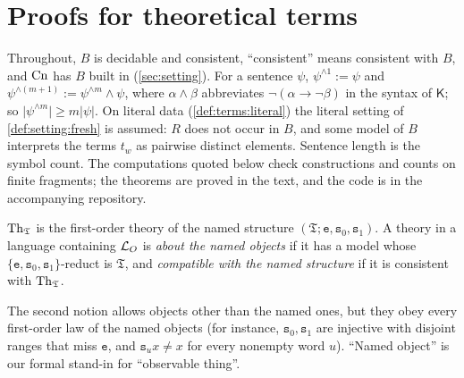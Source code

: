 \section{Proofs for theoretical terms}\label{app:terms}

Throughout, $B$ is decidable and consistent, ``consistent'' means consistent with $B$, and $\mathrm{Cn}$ has $B$ built in (\cref{sec:setting}). For a sentence $\psi$, $\psi^{\wedge1}:=\psi$ and $\psi^{\wedge(m+1)}:=\psi^{\wedge m}\wedge\psi$, where $\alpha\wedge\beta$ abbreviates $\neg(\alpha\to\neg\beta)$ in the syntax of $\mathsf K$; so $\lvert\psi^{\wedge m}\rvert\ge m\lvert\psi\rvert$. On literal data (\cref{def:terms:literal}) the literal setting of \cref{def:setting:fresh} is assumed: $R$ does not occur in $B$, and some model of $B$ interprets the terms $t_w$ as pairwise distinct elements. Sentence length is the symbol count. The computations quoted below check constructions and counts on finite fragments; the theorems are proved in the text, and the code is in the accompanying repository.

\begin{definition}\label{def:terms:named}
$\mathrm{Th}_{\mathfrak{T}}$ is the first-order theory of the named structure $(\mathfrak T;\mathtt e,\mathtt s_0,\mathtt s_1)$. A theory in a language containing $\mathcal{L}_{O}$ is \emph{about the named objects} if it has a model whose $\{\mathtt e,\mathtt s_0,\mathtt s_1\}$-reduct is $\mathfrak T$, and \emph{compatible with the named structure} if it is consistent with $\mathrm{Th}_{\mathfrak{T}}$.
\end{definition}

The second notion allows objects other than the named ones, but they obey every first-order law of the named objects (for instance, $\mathtt s_0,\mathtt s_1$ are injective with disjoint ranges that miss $\mathtt e$, and $\mathtt s_ux\ne x$ for every nonempty word $u$). ``Named object'' is our formal stand-in for ``observable thing''.


